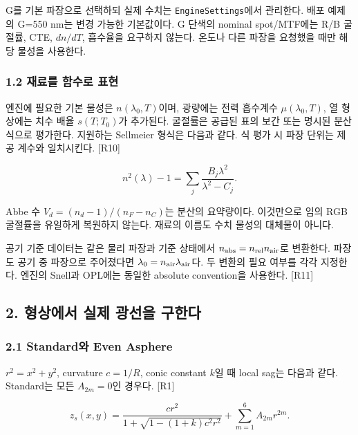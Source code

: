\documentclass[
  a4paper,
]{article}
\begin{document}
G를 기본 파장으로 선택하되 실제 수치는 \texttt{EngineSettings}에서
관리한다. 배포 예제의 G=550 nm는 변경 가능한 기본값이다. G 단색의
nominal spot/MTF에는 R/B 굴절률, CTE, \(dn/dT\), 흡수율을 요구하지
않는다. 온도나 다른 파장을 요청했을 때만 해당 물성을 사용한다.

\hypertarget{uxc7acuxb8ccuxb97c-uxd568uxc218uxb85c-uxd45cuxd604}{%
\subsubsection{1.2 재료를 함수로
표현}\label{uxc7acuxb8ccuxb97c-uxd568uxc218uxb85c-uxd45cuxd604}}

엔진에 필요한 기본 물성은 \(n(\lambda_0,T)\)이며, 광량에는 전력 흡수계수
\(\mu(\lambda_0,T)\), 열 형상에는 치수 배율 \(s(T;T_0)\)가 추가된다.
굴절률은 공급된 표의 보간 또는 명시된 분산식으로 평가한다. 지원하는
Sellmeier 형식은 다음과 같다. 식 평가 시 파장 단위는 제공 계수와
일치시킨다. {[}R10{]}

\[
n^2(\lambda)-1=\sum_j\frac{B_j\lambda^2}{\lambda^2-C_j}.
\]

Abbe 수 \(V_d=(n_d-1)/(n_F-n_C)\)는 분산의 요약량이다. 이것만으로 임의
RGB 굴절률을 유일하게 복원하지 않는다. 재료의 이름도 수치 물성의
대체물이 아니다.

공기 기준 데이터는 같은 물리 파장과 기준 상태에서
\(n_{\rm abs}=n_{\rm rel}n_{\rm air}\)로 변환한다. 파장도 공기 중
파장으로 주어졌다면 \(\lambda_0=n_{\rm air}\lambda_{\rm air}\)다. 두
변환의 필요 여부를 각각 지정한다. 엔진의 Snell과 OPL에는 동일한 absolute
convention을 사용한다. {[}R11{]}

\hypertarget{uxd615uxc0c1uxc5d0uxc11c-uxc2e4uxc81c-uxad11uxc120uxc744-uxad6cuxd55cuxb2e4}{%
\subsection{2. 형상에서 실제 광선을
구한다}\label{uxd615uxc0c1uxc5d0uxc11c-uxc2e4uxc81c-uxad11uxc120uxc744-uxad6cuxd55cuxb2e4}}

\hypertarget{standarduxc640-even-asphere}{%
\subsubsection{2.1 Standard와 Even
Asphere}\label{standarduxc640-even-asphere}}

\(r^2=x^2+y^2\), curvature \(c=1/R\), conic constant \(k\)일 때 local
sag는 다음과 같다. Standard는 모든 \(A_{2m}=0\)인 경우다. {[}R1{]}

\[
z_s(x,y)=\frac{cr^2}{1+\sqrt{1-(1+k)c^2r^2}}
 +\sum_{m=1}^{6}A_{2m}r^{2m}.
\tag{1}
\]
\end{document}
